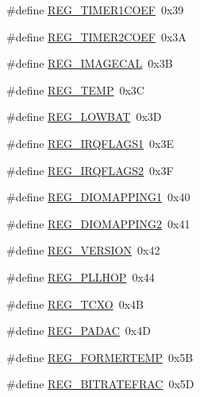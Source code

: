\begin{DoxyCompactItemize}
\item 
\#define \mbox{\hyperlink{sx1276_regs-_fsk_8h_a748e83f19ce0c442f47ff56c3ae2ae1c}{R\+E\+G\+\_\+\+T\+I\+M\+E\+R1\+C\+O\+EF}}~0x39
\item 
\#define \mbox{\hyperlink{sx1276_regs-_fsk_8h_a35594318e2541ff55e79e1ce8d52ab8a}{R\+E\+G\+\_\+\+T\+I\+M\+E\+R2\+C\+O\+EF}}~0x3A
\item 
\#define \mbox{\hyperlink{sx1276_regs-_fsk_8h_aeb557bae3e3e5ffb390a6f6a61ac686d}{R\+E\+G\+\_\+\+I\+M\+A\+G\+E\+C\+AL}}~0x3B
\item 
\#define \mbox{\hyperlink{sx1276_regs-_fsk_8h_ad3b0b6d8d5d3de58e5d56ce84e667b20}{R\+E\+G\+\_\+\+T\+E\+MP}}~0x3C
\item 
\#define \mbox{\hyperlink{sx1276_regs-_fsk_8h_afbb15f7aeaefcb5994a64fff237025f9}{R\+E\+G\+\_\+\+L\+O\+W\+B\+AT}}~0x3D
\item 
\#define \mbox{\hyperlink{sx1276_regs-_fsk_8h_a271d978a9b14435dc5f3d8f3ac9b8951}{R\+E\+G\+\_\+\+I\+R\+Q\+F\+L\+A\+G\+S1}}~0x3E
\item 
\#define \mbox{\hyperlink{sx1276_regs-_fsk_8h_ae93c6dbbf26ea297ba04cbe39c116ff3}{R\+E\+G\+\_\+\+I\+R\+Q\+F\+L\+A\+G\+S2}}~0x3F
\item 
\#define \mbox{\hyperlink{sx1276_regs-_fsk_8h_ac16d5678e98fa6ab73655240a11f9b69}{R\+E\+G\+\_\+\+D\+I\+O\+M\+A\+P\+P\+I\+N\+G1}}~0x40
\item 
\#define \mbox{\hyperlink{sx1276_regs-_fsk_8h_aec8b1ddf72925f502675593fabcc469f}{R\+E\+G\+\_\+\+D\+I\+O\+M\+A\+P\+P\+I\+N\+G2}}~0x41
\item 
\#define \mbox{\hyperlink{sx1276_regs-_fsk_8h_aa7075c0ae73420685bb4278ee580f3fa}{R\+E\+G\+\_\+\+V\+E\+R\+S\+I\+ON}}~0x42
\item 
\#define \mbox{\hyperlink{sx1276_regs-_fsk_8h_a6a8f2748b149c14533e877f06e4720f3}{R\+E\+G\+\_\+\+P\+L\+L\+H\+OP}}~0x44
\item 
\#define \mbox{\hyperlink{sx1276_regs-_fsk_8h_a57f595889f6a6af755ecc9b3bb5b4c3d}{R\+E\+G\+\_\+\+T\+C\+XO}}~0x4B
\item 
\#define \mbox{\hyperlink{sx1276_regs-_fsk_8h_ad64f0f69f548f51e16be4a9a07d980cd}{R\+E\+G\+\_\+\+P\+A\+D\+AC}}~0x4D
\item 
\#define \mbox{\hyperlink{sx1276_regs-_fsk_8h_a1c2bc2d26e0f676a4f012e975f1d86f2}{R\+E\+G\+\_\+\+F\+O\+R\+M\+E\+R\+T\+E\+MP}}~0x5B
\item 
\#define \mbox{\hyperlink{sx1276_regs-_fsk_8h_a1e0117bd4c660d60afc9d119840f9e26}{R\+E\+G\+\_\+\+B\+I\+T\+R\+A\+T\+E\+F\+R\+AC}}~0x5D
\item 

\end{DoxyCompactItemize}
